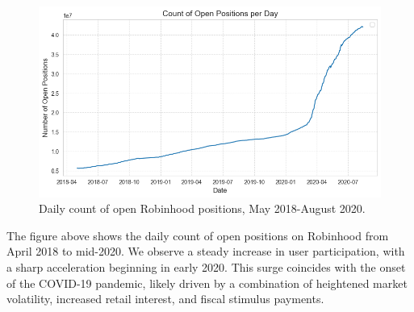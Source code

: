 \begin{figure}[H]
    \centering
    \includegraphics[width=0.8\linewidth]{../images/old/no_positions_date.png}
    \caption{Daily count of open Robinhood positions, May 2018-August 2020.}
\end{figure}

The figure above shows the daily count of open positions on Robinhood from April 2018 to mid-2020. 
We observe a steady increase in user participation, with a sharp acceleration beginning in early 2020. 
This surge coincides with the onset of the COVID-19 pandemic, likely driven by a combination of heightened market volatility, increased retail interest, and fiscal stimulus payments.
